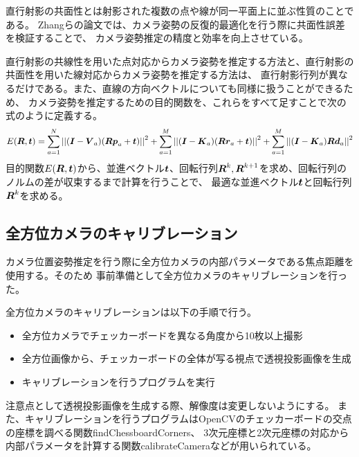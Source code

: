 \documentclass[]{jarticle}          %
\begin{document}
直行射影の共面性とは射影された複数の点や線が同一平面上に並ぶ性質のことである。
Zhangらの論文では、カメラ姿勢の反復的最適化を行う際に共面性誤差を検証することで、
カメラ姿勢推定の精度と効率を向上させている。

直行射影の共線性を用いた点対応からカメラ姿勢を推定する方法と、直行射影の共面性を用いた線対応からカメラ姿勢を推定する方法は、
直行射影行列が異なるだけである。また、直線の方向ベクトルについても同様に扱うことができるため、
カメラ姿勢を推定するための目的関数を、これらをすべて足すことで次の式のように定義する。
\begin{equation}
  E(\mbox{\boldmath $R$},\mbox{\boldmath $t$})=\sum^N_{a=1}{||(\mbox{\boldmath $I$}-\mbox{\boldmath $V$}_a)(\mbox{\boldmath $R$}\mbox{\boldmath $p$}_a+\mbox{\boldmath $t$})||}^2+\sum^M_{a=1}{||(\mbox{\boldmath $I$}-\mbox{\boldmath $K$}_a)(\mbox{\boldmath $R$}\mbox{\boldmath $r$}_a+\mbox{\boldmath $t$})||}^2+\sum^M_{a=1}{||(\mbox{\boldmath $I$}-\mbox{\boldmath $K$}_a)\mbox{\boldmath $R$}\mbox{\boldmath $d$}_a||}^2
\end{equation}
目的関数$E(\mbox{\boldmath $R$},\mbox{\boldmath $t$})$から、並進ベクトル$\mbox{\boldmath $t$}$、回転行列$\mbox{\boldmath $R$}^k,\mbox{\boldmath $R$}^{k+1}$を求め、回転行列のノルムの差が収束するまで計算を行うことで、
最適な並進ベクトル$\mbox{\boldmath $t$}$と回転行列$\mbox{\boldmath $R$}^k$を求める。

\subsection{全方位カメラのキャリブレーション}
カメラ位置姿勢推定を行う際に全方位カメラの内部パラメータである焦点距離を使用する。そのため
事前準備として全方位カメラのキャリブレーションを行った。

全方位カメラのキャリブレーションは以下の手順で行う。
\begin{itemize}
  \item 全方位カメラでチェッカーボードを異なる角度から10枚以上撮影
  \item 全方位画像から、チェッカーボードの全体が写る視点で透視投影画像を生成
  \item キャリブレーションを行うプログラムを実行
\end{itemize}
注意点として透視投影画像を生成する際、解像度は変更しないようにする。
また、キャリブレーションを行うプログラムはOpenCVのチェッカーボードの交点の座標を調べる関数findChessboardCorners、
3次元座標と2次元座標の対応から内部パラメータを計算する関数calibrateCameraなどが用いられている。
\end{document}
